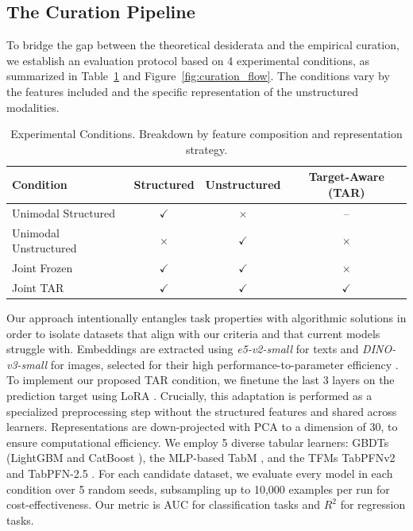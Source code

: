 \documentclass{article}
\begin{document}
\subsection{The Curation Pipeline}
\label{sec:benchmark_design}

To bridge the gap between the theoretical desiderata and the empirical curation, we establish an evaluation protocol based on 4 experimental conditions, as summarized in Table~\ref{tab:conditions} and Figure~\ref{fig:curation_flow}. The conditions vary by the features included and the specific representation of the unstructured modalities.


\begin{table}[ht]
\centering
\caption{Experimental Conditions. Breakdown by feature composition and representation strategy.}
\label{tab:conditions}
\begin{tabular}{lccc}
\hline
\textbf{Condition} & \textbf{Structured} & \textbf{Unstructured} & \textbf{Target-Aware (TAR)} \\ \hline
Unimodal Structured   & $\checkmark$ & $\times$     & -- \\
Unimodal Unstructured & $\times$     & $\checkmark$ & $\times$ \\
Joint Frozen          & $\checkmark$ & $\checkmark$ & $\times$ \\
Joint TAR             & $\checkmark$ & $\checkmark$ & $\checkmark$ \\ \hline
\end{tabular}
\end{table}

Our approach intentionally entangles task properties with algorithmic solutions in order to isolate datasets that align with our criteria and that current models struggle with.  Embeddings are extracted using \textit{e5-v2-small} \cite{wang_text_2024} for texts and \textit{DINO-v3-small} \cite{simeoni_dinov3_2025} for images, selected for their high performance-to-parameter efficiency \cite{muennighoff_mteb_2023}. To implement our proposed TAR condition, we finetune the last 3 layers on the prediction target using LoRA \cite{hu_lora_2021}. Crucially, this adaptation is performed as a specialized preprocessing step without the structured features and shared across learners. Representations are down-projected with PCA \cite{mackiewicz_principal_1993} to a dimension of 30, to ensure computational efficiency. We employ 5 diverse tabular learners: GBDTs (LightGBM \cite{ke_lightgbm_2017} and CatBoost \cite{prokhorenkova_catboost_2018}), the MLP-based TabM \cite{gorishniy_tabm_2025}, and the TFMs TabPFNv2 \cite{hollmann_accurate_2025} and TabPFN-2.5 \cite{grinsztajn_tabpfn-25_2026}. For each candidate dataset, we evaluate every model in each condition over 5 random seeds, subsampling up to 10,000 examples per run for cost-effectiveness. Our metric is AUC for classification tasks and $R^2$ for regression tasks. 
\end{document}
